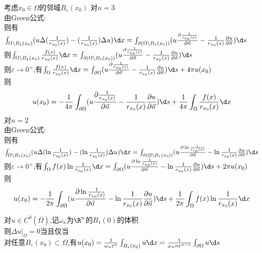 \begin{jie}
考虑$x_0\in \Omega$的邻域$B_{\varepsilon}(x_0)$
对$n=3$\\
由Green公式:\\
则有$\int_{\Omega\backslash B_{\varepsilon}(x_0)}(u\Delta(\frac{1}{r_{x_0}(x)})-(\frac{1}{r_{x_0}(x)})\Delta u)\d x=\int_{\partial (\Omega\backslash B_{\varepsilon}(x_0))}(u\frac{\partial \frac{1}{r_{x_0}(x)}}{\partial \vec{n}}-\frac{1}{r_{x_0}(x)}\frac{\partial u}{\partial \vec{n}})\d s$\\
则$\int_{\Omega\backslash B_{\varepsilon}(x_0)}\frac{f(x)}{r_{x_0}(x)}\d x=\int_{\partial (\Omega\backslash B_{\varepsilon}(x_0))}(u\frac{\partial \frac{1}{r_{x_0}(x)}}{\partial \vec{n}}-\frac{1}{r_{x_0}(x)}\frac{\partial u}{\partial \vec{n}})\d s$\\
则$\varepsilon\to 0^{+}$,有$\int_{\Omega}\frac{f(x)}{r_{x_0}(x)}\d x=\int_{\partial \Omega}(u\frac{\partial \frac{1}{r_{x_0}(x)}}{\partial \vec{n}}-\frac{1}{r_{x_0}(x)}\frac{\partial u}{\partial \vec{n}})\d s+4\pi u(x_0)$\\
则\[u(x_0)=-\frac{1}{4\pi}\int_{\partial \Omega}(u\frac{\partial \frac{1}{r_{x_0}(x)}}{\partial \vec{n}}-\frac{1}{r_{x_0}(x)}\frac{\partial u}{\partial \vec{n}})\d s+\frac{1}{4\pi}\int_{\Omega}\frac{f(x)}{r_{x_0}(x)}\d x\]
对$n=2$\\
由Green公式:\\
则有$\int_{\Omega\backslash B_{\varepsilon}(x_0)}(u\Delta(\ln \frac{1}{r_{x_0}(x)})-(\ln \frac{1}{r_{x_0}(x)})\Delta u)\d x=\int_{\partial (\Omega\backslash B_{\varepsilon}(x_0))}(u\frac{\partial \ln \frac{1}{r_{x_0}(x)}}{\partial \vec{n}}-\ln \frac{1}{r_{x_0}(x)}\frac{\partial u}{\partial \vec{n}})\d s$\\
则$\varepsilon\to 0^{+}$,有$\int_{\Omega}f(x)\ln \frac{1}{r_{x_0}(x)}\d x=\int_{\partial \Omega}(u\frac{\partial \ln \frac{1}{r_{x_0}(x)}}{\partial \vec{n}}-\ln \frac{1}{r_{x_0}(x)}\frac{\partial u}{\partial \vec{n}})\d s+2\pi u(x_0)$\\
则\[u(x_0)=-\frac{1}{2\pi}\int_{\partial \Omega}(u\frac{\partial \ln \frac{1}{r_{x_0}(x)}}{\partial \vec{n}}-\ln \frac{1}{r_{x_0}(x)}\frac{\partial u}{\partial \vec{n}})\d s+\frac{1}{2\pi}\int_{\Omega}f(x)\ln\frac{1}{r_{x_0}(x)}\d x\]
\end{jie}

\begin{dingli*}
对$u\in C^0(\overline{\Omega})$,记$\omega_n$为$\R^n$的$B_{1}(0)$的体积\\
则$\Delta u|_{\Omega}=0$当且仅当\\
对任意$B_{\varepsilon}(x_0)\subset \Omega$,有$u(x_0)=\frac{1}{\omega_n\varepsilon^n}\int_{B_{\varepsilon}(x_0)}u\d x=\frac{1}{\omega_nn \varepsilon^{n-1}}\int_{\partial \Omega}u\d s$
\end{dingli*}

